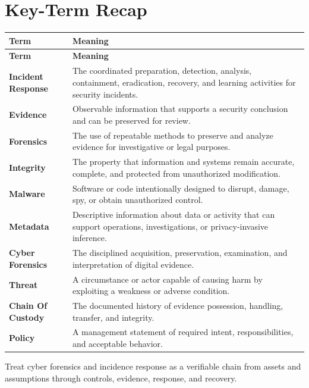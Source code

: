 \documentclass[11pt]{article}
\begin{document}
\section*{Key-Term Recap}
\begin{longtable}{>{\RaggedRight\arraybackslash}p{}>{\RaggedRight\arraybackslash}p{}}
\toprule\rowcolor{Navy}\color{white}\textbf{Term} & \color{white}\textbf{Meaning}\\\midrule
\endfirsthead
\toprule\rowcolor{Navy}\color{white}\textbf{Term} & \color{white}\textbf{Meaning}\\\midrule
\endhead
\textbf{Incident Response} & The coordinated preparation, detection, analysis, containment, eradication, recovery, and learning activities for security incidents. \\\midrule
\textbf{Evidence} & Observable information that supports a security conclusion and can be preserved for review. \\\midrule
\textbf{Forensics} & The use of repeatable methods to preserve and analyze evidence for investigative or legal purposes. \\\midrule
\textbf{Integrity} & The property that information and systems remain accurate, complete, and protected from unauthorized modification. \\\midrule
\textbf{Malware} & Software or code intentionally designed to disrupt, damage, spy, or obtain unauthorized control. \\\midrule
\textbf{Metadata} & Descriptive information about data or activity that can support operations, investigations, or privacy-invasive inference. \\\midrule
\textbf{Cyber Forensics} & The disciplined acquisition, preservation, examination, and interpretation of digital evidence. \\\midrule
\textbf{Threat} & A circumstance or actor capable of causing harm by exploiting a weakness or adverse condition. \\\midrule
\textbf{Chain Of Custody} & The documented history of evidence possession, handling, transfer, and integrity. \\\midrule
\textbf{Policy} & A management statement of required intent, responsibilities, and acceptable behavior. \\\midrule
\bottomrule
\end{longtable}
\begin{takeawaybox}
Treat cyber forensics and incidence response as a verifiable chain from assets and assumptions through controls, evidence, response, and recovery.
\end{takeawaybox}
\end{document}
